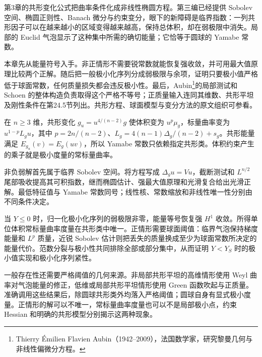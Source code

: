 \ProseParagraphBreak
第3章的共形变化公式把曲率条件化成非线性椭圆方程。第三编已经提供 Sobolev 空间、椭圆正则性、Banach 微分与约束变分，眼下的新障碍是临界指数：一列共形因子可以在越来越小的区域变得越来越高，保持总体积，却在弱极限中消失。局部的 Euclid 气泡显示了这种集中所需的确切能量；它恰等于圆球的 Yamabe 常数。

\ProseParagraphBreak
本章先从能量符号入手。非正情形不需要锐常数就能恢复强收敛，并可用最大值原理比较两个正解。随后把一般极小化序列分成弱极限与余项，证明只要极小值严格低于球面常数，任何质量损失都会违反极小性。最后，Aubin\footnote{Thierry Émilien Flavien Aubin（1942--2009），法国数学家，研究黎曼几何与非线性偏微分方程。}的局部测试和 Schoen 的整体构造负责取得这个严格不等号；正质量输入连同其维数、共形平坦及刚性条件在第24.5节列出。共形方程、球面模型与变分方法的原文组织可参看\cite[第2--4节]{LeeParker1987Yamabe}。







\begin{chaptersummary}
	在 \(n\ge3\) 维，共形变化 \(g_u=u^{4/(n-2)}g\) 使体积变为 \(u^p\mu_g\)，标量曲率变为 \(u^{1-p}L_gu\)，其中 \(p=2n/(n-2)\)、\(L_g=4(n-1)\Delta_g/(n-2)+s_g\)。共形能量满足 \(E_{g_u}(v)=E_g(uv)\)，所以 Yamabe 常数只依赖指定共形类。体积约束产生的乘子就是极小度量的常标量曲率。

	\ProseParagraphBreak
	非负弱解首先属于临界 Sobolev 空间。将方程写成 \(\Delta_gu=Vu\)，截断测试和 \(L^{n/2}\) 尾部吸收提高其可积指数，继而椭圆估计、强最大值原理和光滑复合给出光滑正解。最低特征值与 Yamabe 常数同号；线性核、常数缩放和非线性唯一性分别由不同条件决定。

	\ProseParagraphBreak
	当 \(Y\le0\) 时，归一化极小化序列的弱极限非零，能量等号恢复强 \(H^1\) 收敛。所得单位体积常标量曲率度量在共形类中唯一。正情形需要球面阈值：临界气泡保持梯度能量和 \(L^p\) 质量，近锐 Sobolev 估计则把丢失的质量换成至少为球面常数所决定的能量代价。范数分裂与极小性共同排除全部或部分集中，从而证明 \(Y<Y_S\) 时的极小值实现和极小化序列紧性。

	\ProseParagraphBreak
	一般存在性还需要严格阈值的几何来源。非局部共形平坦的高维情形使用 Weyl 曲率对气泡能量的修正，低维或局部共形平坦情形使用 Green 函数吹起与正质量。准确调用这些结果后，除圆球共形类外均落入严格阈值；圆球自身有显式极小度量。正情形的解可以不唯一，常标量曲率度量也可以不是局部极小点，约束 Hessian 和明确的共形模型分别揭示这两种现象。
\end{chaptersummary}

